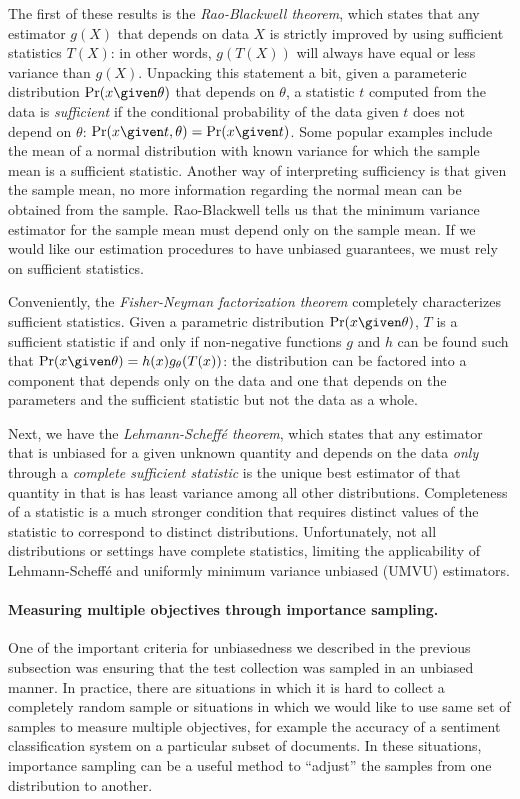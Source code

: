 The first of these results is the \textit{Rao-Blackwell theorem}, which states that any estimator $g(X)$ that depends on data $X$ is strictly improved by using sufficient statistics $T(X)$: in other words, $g(T(X))$ will always have equal or less variance than $g(X)$.
Unpacking this statement a bit, given a parameteric distribution $\Pr(x \given \theta)$ that depends on $\theta$, a statistic $t$  computed from the data is \textit{sufficient} if the conditional probability of the data given $t$ does not depend on $\theta$: $\Pr(x \given t, \theta) = \Pr(x \given t)$.
Some popular examples include the mean of a normal distribution with known variance for which the sample mean is a sufficient statistic.
Another way of interpreting sufficiency is that given the sample mean, no more information regarding the normal mean can be obtained from the sample. 
Rao-Blackwell tells us that the minimum variance estimator for the sample mean must depend only on the sample mean.
If we would like our estimation procedures to have unbiased guarantees, we must rely on sufficient statistics.

Conveniently, the \textit{Fisher-Neyman factorization theorem} completely characterizes sufficient statistics.
Given a parametric distribution $\Pr(x \given \theta)$, $T$ is a sufficient statistic if and only if non-negative functions $g$ and $h$ can be found such that $\Pr(x \given \theta) = h(x) g_\theta(T(x))$:
  the distribution can be factored into a component that depends only on the data and one that depends on the parameters and the sufficient statistic but not the data as a whole.

Next, we have the \textit{Lehmann-Scheff\'{e} theorem}, which states that any estimator that is unbiased for a given unknown quantity and depends on the data \textit{only} through a \textit{complete sufficient statistic} is the unique best estimator of that quantity in that is has least variance among all other distributions.
Completeness of a statistic is a much stronger condition that requires distinct values of the statistic to correspond to distinct distributions.
Unfortunately, not all distributions or settings have complete statistics, limiting the applicability of Lehmann-Scheff\'{e} and uniformly minimum variance unbiased (UMVU) estimators.

\paragraph{Measuring multiple objectives through importance sampling.}
One of the important criteria for unbiasedness we described in the previous subsection was ensuring that the test collection was sampled in an unbiased manner.
In practice, there are situations in which it is hard to collect a completely random sample or situations in which we would like to use same set of samples to measure multiple objectives, for example the accuracy of a sentiment classification system on a particular subset of documents.
In these situations, importance sampling can be a useful method to ``adjust'' the samples from one distribution to another.

